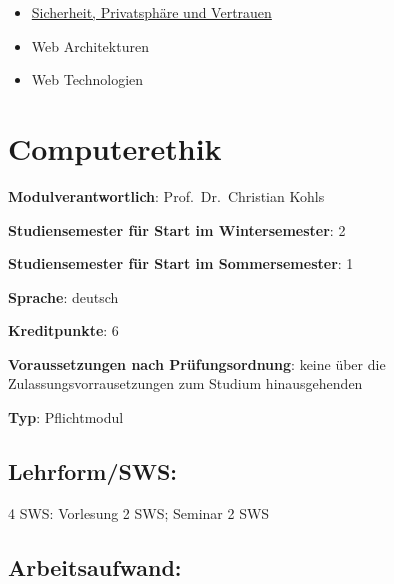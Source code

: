 \begin{itemize}
\tightlist
\item
  \hyperref[/mi-2017/modulbeschreibungen-master/MA_WTW_Modul_IT-Sicherheit]{Sicherheit,
  Privatsphäre und Vertrauen}
\item
  Web Architekturen
\item
  Web Technologien
\end{itemize}

\chapter{Computerethik\label{/mi-2017/modulbeschreibungen-master/MA_All_Computerethik}}\label{computerethikpathlabelmi-2017modulbeschreibungen-mastermaux5fallux5fcomputerethik}

\begin{modulHead}
\textbf{Modulverantwortlich}: Prof.~Dr.~Christian
Kohls
\end{modulHead}
\begin{modulHead}
\textbf{Studiensemester für
Start im Wintersemester}:
2
\end{modulHead}
\begin{modulHead}
\textbf{Studiensemester für Start
im Sommersemester}:
1
\end{modulHead}
\begin{modulHead}
\textbf{Sprache}:
deutsch
\end{modulHead}
\begin{modulHead}
\textbf{Kreditpunkte}:
6
\end{modulHead}
\begin{modulHead}
\textbf{Voraussetzungen nach
Prüfungsordnung}: keine über die Zulassungsvorrausetzungen zum Studium
hinausgehenden
\end{modulHead}
\begin{modulHead}
\textbf{Typ}:
Pflichtmodul
\end{modulHead}


\section*{Lehrform/SWS:\label{/mi-2017/modulbeschreibungen-master/MA_All_Computerethik}}\label{lehrformswspathlabelmi-2017modulbeschreibungen-mastermaux5fallux5fcomputerethik}

4 SWS: Vorlesung 2 SWS; Seminar 2 SWS

\section*{Arbeitsaufwand:\label{/mi-2017/modulbeschreibungen-master/MA_All_Computerethik}}\label{arbeitsaufwandpathlabelmi-2017modulbeschreibungen-mastermaux5fallux5fcomputerethik}

